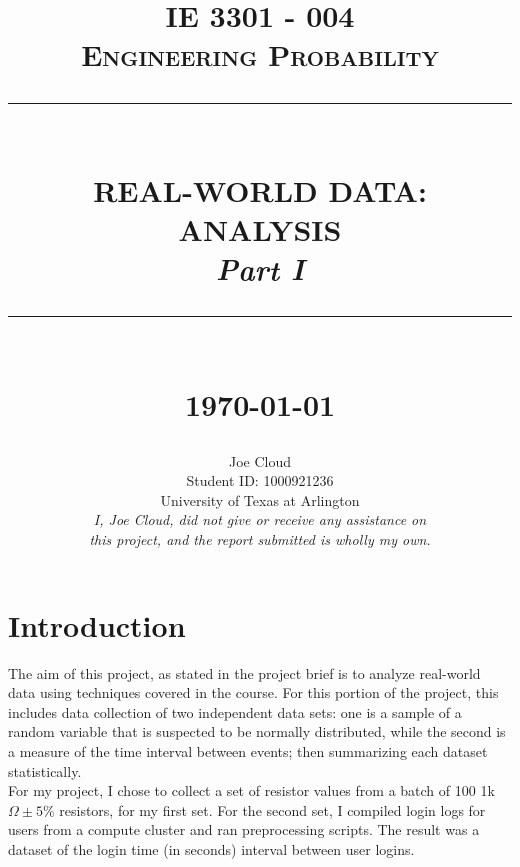 \documentclass[10.5pt]{report}
\newcommand{\HRule}[1]{\rule{\linewidth}{#1}}
\begin{document}
\title{ \normalsize \textsc{IE 3301 - 004 \\ Engineering Probability}
		\\ [2.0cm]
		\HRule{0.5pt} \\
		\LARGE \textbf{\uppercase{Real-World Data: Analysis}} \\
        \normalsize \textit{Part I}  
		\HRule{2pt} \\ [0.5cm]
		\normalsize \today \vspace*{5\baselineskip}}

\date{}

\author{
        Joe Cloud \\
		Student ID: 1000921236 \\
        University of Texas at Arlington \\[1in]
        \textit{I, Joe Cloud, did not give or receive any assistance on }\\ 
        \textit{this project, and the report submitted is wholly my own.}}
    


\maketitle
\tableofcontents
\newpage

\sectionfont{\scshape}


\section*{Introduction}

The aim of this project, as stated in the project brief is to analyze real-world 
data using techniques covered in the course. For this portion of the project, 
this includes data collection of two independent data sets: one is a
sample of a random variable that is suspected to be normally distributed, while
the second is a measure of the time interval between events; then summarizing each
dataset statistically. \\ For my project, I chose to collect a set of resistor values
from a batch of 100 1k$\Omega \pm 5\%$ resistors, for my first set. For the second set,
I compiled login logs for users from a compute cluster and ran preprocessing scripts. 
The result was a dataset of the login time (in seconds) interval between user logins. 
\end{document}
